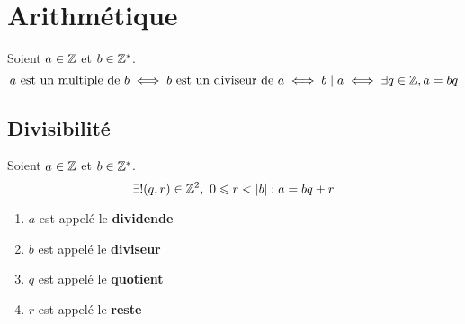 \chapter{Arithmétique}
\def\arraystretch{1}

\begin{definition}
    Soient $a \in \mathbb{Z}$ et $b \in \mathbb{Z}^*$.
    \[ a \text{ est un multiple de } b \iff b \text{ est un diviseur de } a \iff b \mid a \iff \exists q \in \mathbb{Z}, a = bq \]
\end{definition}

\section{Divisibilité}

\begin{theorem}
    Soient $a \in \mathbb{Z}$ et $b \in \mathbb{Z}^*$.
    \[ \exists ! (q, r) \in \mathbb{Z}^2,\ 0 \leqslant r < \abs{b} : a = bq + r  \]
    \begin{enumerate}
    	\item $a$ est appelé le \textbf{dividende}
        \item $b$ est appelé le \textbf{diviseur}
        \item $q$ est appelé le \textbf{quotient}
        \item $r$ est appelé le \textbf{reste}
    \end{enumerate}
\end{theorem}

